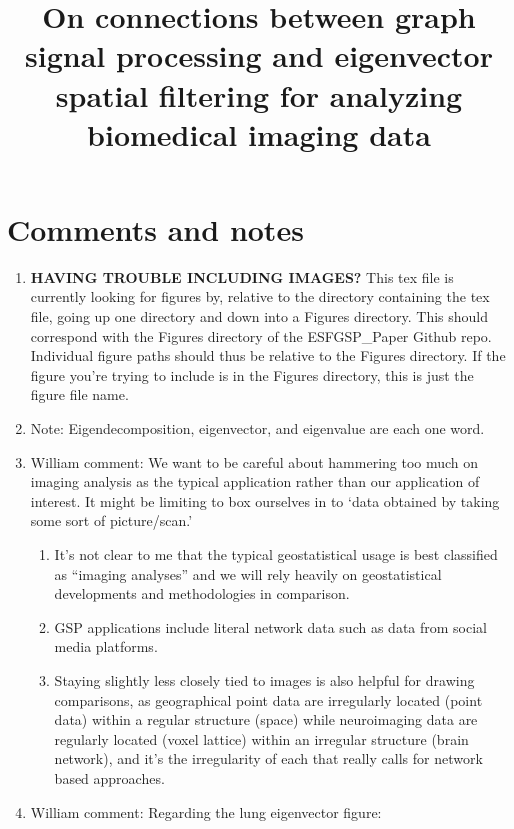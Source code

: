 \documentclass[12pt]{article}
\begin{document}
\title{On connections between graph signal processing and eigenvector spatial filtering for analyzing biomedical imaging data}
\date{}
\maketitle

\section*{Comments and notes}

\begin{enumerate}[$\bullet$]
	\item \textbf{HAVING TROUBLE INCLUDING IMAGES?} This tex file is currently looking for figures by, relative to the directory containing the tex file, going up one directory and down into a Figures directory. This should correspond with the Figures directory of the ESFGSP\_Paper Github repo. Individual figure paths should thus be relative to the Figures directory. If the figure you're trying to include is in the Figures directory, this is just the figure file name.
	\item Note: Eigendecomposition, eigenvector, and eigenvalue are each one word.
	\item William comment: We want to be careful about hammering too much on imaging analysis as the typical application rather than our application of interest. It might be limiting to box ourselves in to `data obtained by taking some sort of picture/scan.'
	      \begin{enumerate}
		      \item It's not clear to me that the typical geostatistical usage is best classified as ``imaging analyses'' and we will rely heavily on geostatistical developments and methodologies in comparison.
		      \item GSP applications include literal network data such as data from social media platforms.
		      \item Staying slightly less closely tied to images is also helpful for drawing comparisons, as geographical point data are irregularly located (point data) within a regular structure (space) while neuroimaging data are regularly located (voxel lattice) within an irregular structure (brain network), and it's the irregularity of each that really calls for network based approaches.
	      \end{enumerate}
	\item William comment: Regarding the lung eigenvector figure:

\end{enumerate}
\end{document}
